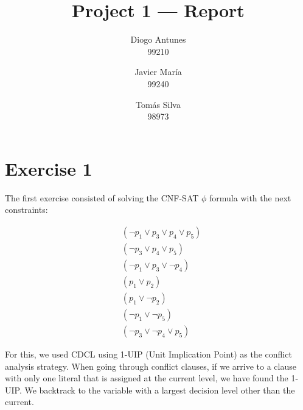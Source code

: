 \documentclass[12pt]{article}
\begin{document}
\title{Project 1 — Report}
\author{
  Diogo Antunes\\
  99210
  \and
  Javier María\\
  99240
  \and
  Tomás Silva\\
  98973
}

\maketitle

\section*{Exercise 1}

The first exercise consisted of solving the CNF-SAT $\phi$ formula with the next constraints:

\begin{align}
        & (\lnot p_{1} \vee p_{3} \vee p_{4} \vee p_{5}) \\
        & (\lnot p_{3} \vee p_{4} \vee p_{5}) \\
        & (\lnot p_{1} \vee p_{3} \vee \lnot p_{4}) \\
        & (p_{1} \vee p_{2}) \\
        & (p_{1} \vee \lnot p_{2}) \\
        & (\lnot p_{1} \vee \lnot p_{5}) \\
        & (\lnot p_{3} \vee \lnot p_{4} \vee p_{5})
\end{align}

\vspace{0.5cm}

For this, we used CDCL using 1-UIP (Unit Implication Point) as the conflict analysis strategy.
When going through conflict clauses, if we arrive to a clause with only one literal that is assigned at the current level, we have found the 1-UIP.
We backtrack to the variable with a largest decision level other than the current.

\vspace{0.5cm}
\end{document}
